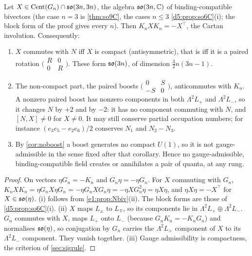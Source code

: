 \begin{theorem}
\label{e1:thm:Nrule}
Let $X\in\operatorname{Cent}(G_n)\cap\mathfrak{so}(3n,3n)$, the algebra $\mathfrak{so}(3n,\mathbb{C})$ of binding-compatible bivectors (the case $n=3$ is \cref{thm:so9C}, the cases $n\le3$
\cref{d5:prop:so6C}(i); the block form of the proof gives every $n$). Then $K_nXK_n=-X^{\!\top}$, the Cartan involution. Consequently:
\begin{enumerate}[label=(\roman*),leftmargin=2.2em]
\item $X$ commutes with $N$ iff $X$ is compact (antisymmetric), that is iff it is a paired rotation $\bigl(\begin{smallmatrix}R&0\\0&R\end{smallmatrix}\bigr)$.
These form $\mathfrak{so}(3n)$, of dimension $\tfrac32n(3n-1)$.
\item The non-compact part, the paired boosts $\bigl(\begin{smallmatrix}0&S\\-S&0\end{smallmatrix}\bigr)$, anticommutes with $K_n$. A nonzero paired
boost has nonzero components in both $\Lambda^2L_+$ and $\Lambda^2L_-$, so it changes $N$ by $+2$ and by $-2$: it has no component commuting
with $N$, and $[N,X]\neq0$ for $X\neq0$. It may still conserve partial occupation numbers; for instance $(e_3e_5-e_2e_6)/2$ conserves $N_1$ and
$N_2-N_3$.
\item By \cref{cor:noboost} a boost generates no compact $U(1)$, so it is not gauge-admissible in the sense fixed after that corollary.
Hence no gauge-admissible, binding-compatible field creates or annihilates a pair of quanta, at any rung.
\end{enumerate}
\end{theorem}

\begin{proof}
On vectors $\eta G_n=-K_n$ and $G_n\eta=-\eta G_n$. For $X$ commuting with $G_n$,
$K_nXK_n=\eta G_nX\eta G_n=-\eta G_nXG_n\eta=-\eta XG_n^2\eta=\eta X\eta$, and $\eta X\eta=-X^{\!\top}$ for $X\in\mathfrak{so}(\eta)$. (i) follows from \cref{e1:prop:Nbiv}(ii). The block
forms are those of \cref{d5:prop:so6C}(i). (ii) $X$ maps $L_\pm$ to $L_\mp$, so its components lie in $\Lambda^2L_+\oplus\Lambda^2L_-$.
$G_n$ commutes with $X$, maps $L_+$ onto $L_-$ (because $G_nK_n=-K_nG_n$) and normalises $\mathfrak{so}(\eta)$, so conjugation by $G_n$ carries the $\Lambda^2L_+$
component of $X$ to its $\Lambda^2L_-$ component. They vanish together. (iii) Gauge admissibility is compactness, the criterion of
\cref{sec:sigrule}.
\end{proof}


